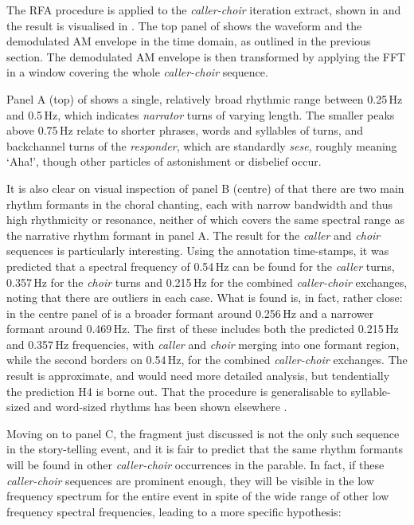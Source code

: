 \documentclass[output=paper,colorlinks,citecolor=brown]{langscibook}
\begin{document}
The RFA procedure is applied to the \textit{caller-choir} iteration extract, shown in  and the result is visualised in . The top panel of  shows the waveform and the demodulated AM envelope in the time domain, as outlined in the previous section. The demodulated AM envelope is then transformed by applying the FFT in a window covering the whole \textit{caller-choir} sequence.

Panel A (top) of  shows a single, relatively broad rhythmic range between 0.25\,Hz and 0.5\,Hz, which indicates \textit{narrator} turns of varying length. The smaller peaks above 0.75\,Hz relate to shorter phrases, words and syllables of turns, and backchannel turns of the \textit{responder}, which are standardly \textit{sese}, roughly meaning `Aha!', though other particles of astonishment or disbelief occur.

It is also clear on visual inspection of panel B (centre) of  that there are two main rhythm formants in the choral chanting, each with narrow bandwidth and thus high rhythmicity or resonance, neither of which covers the same spectral range as the narrative rhythm formant in panel A. The result for the \textit{caller} and \textit{choir} sequences is particularly interesting. Using the annotation time-stamps, it was predicted that a spectral frequency of 0.54\,Hz can be found for the \textit{caller} turns, 0.357\,Hz for the \textit{choir} turns and 0.215\,Hz for the combined \textit{caller-choir} exchanges, noting that there are outliers in each case. What is found is, in fact, rather close: in the centre panel of  is a broader formant around 0.256\,Hz and a narrower formant around 0.469\,Hz. The first of these includes both the predicted 0.215\,Hz and 0.357\,Hz frequencies, with \textit{caller} and \textit{choir} merging into one formant region, while the second borders on 0.54\,Hz, for the combined \textit{caller-choir} exchanges. The result is approximate, and would need more detailed analysis, but tendentially the prediction H4 is borne out. That the procedure is generalisable to syllable-sized and word-sized rhythms has been shown elsewhere \citep{gibbonjipa2021}.

Moving on to panel C, the fragment just discussed is not the only such sequence in the story-telling event, and it is fair to predict that the same rhythm formants will be found in other \textit{caller-choir} occurrences in the parable. In fact, if these \textit{caller-choir} sequences are prominent enough, they will be visible in the low frequency spectrum for the entire event in spite of the wide range of other low frequency spectral frequencies, leading to a more specific hypothesis:
\end{document}
